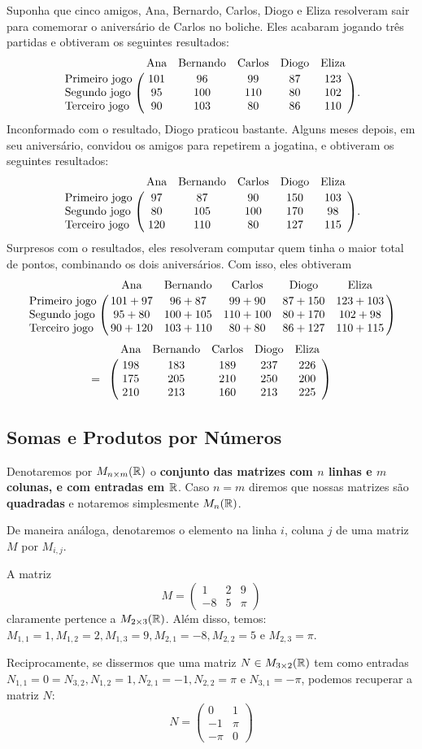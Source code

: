 \begin{ex}
	Suponha que cinco amigos, Ana, Bernardo, Carlos, Diogo e Eliza resolveram sair para comemorar o aniversário de Carlos no boliche. Eles acabaram jogando três partidas e obtiveram os seguintes resultados:
	\[\bordermatrix{
	&\text{Ana} & \text{Bernando} & \text{Carlos} & \text{Diogo} &\text{Eliza}\cr
	\text{Primeiro jogo} & 101 & 96 & 99 & 87 & 123\cr
	\text{Segundo jogo} & 95 & 100 & 110 & 80 & 102\cr
	\text{Terceiro jogo} & 90 & 103 & 80 & 86 & 110}.\]Inconformado com o resultado, Diogo praticou bastante. Alguns meses depois, em seu aniversário, convidou os amigos para repetirem a jogatina, e obtiveram os seguintes resultados:
	\[\bordermatrix{
		&\text{Ana} & \text{Bernando} & \text{Carlos} & \text{Diogo} &\text{Eliza}\cr
		\text{Primeiro jogo} & 97 & 87 & 90 & 150 & 103\cr
		\text{Segundo jogo} & 80 & 105 & 100 & 170 & 98\cr
		\text{Terceiro jogo} & 120 & 110 & 80 & 127 & 115}.\] Surpresos com o resultados, eles resolveram computar quem tinha o maior total de pontos, combinando os dois aniversários. Com isso, eles obtiveram
	\[\bordermatrix{
		&\text{Ana} & \text{Bernando} & \text{Carlos} & \text{Diogo} &\text{Eliza}\cr
		\text{Primeiro jogo} & 101+97 & 96+87 & 99+90 & 87+150 & 123+103\cr
		\text{Segundo jogo} & 95+80 & 100+105 & 110+100 & 80+170 & 102+98\cr
		\text{Terceiro jogo} & 90+120 & 103+110 & 80+80 & 86+127 & 110+115}\]\[=\bordermatrix{
		&\text{Ana} & \text{Bernando} & \text{Carlos} & \text{Diogo} &\text{Eliza}\cr
		 & 198 & 183 & 189 & 237 & 226\cr
		 & 175 & 205 & 210 & 250 & 200\cr
		 & 210 & 213 & 160 & 213 & 225}\]
\end{ex}

\subsection{Somas e Produtos por Números}

\begin{df}
	Denotaremos por $M_{n\times m}(\mathbb R)$ o \textbf{conjunto das matrizes com $n$ linhas e $m$ colunas, e com entradas em $\mathbb R$}. Caso $n=m$ diremos que nossas matrizes são \textbf{quadradas} e notaremos simplesmente $M_n(\mathbb R)$.
	
	De maneira análoga, denotaremos o elemento na linha $i$, coluna $j$ de uma matriz $M$ por $M_{i,j}$.
\end{df}

\begin{ex}
	A matriz \[M=\begin{pmatrix}
	1 & 2 & 9\\
	-8 & 5 & \pi
	\end{pmatrix}\]claramente pertence a $M_{2\times 3}(\mathbb R)$. Além disso, temos: $M_{1,1}=1,M_{1,2}=2,M_{1,3}=9,M_{2,1}=-8,M_{2,2}=5$ e $M_{2,3}=\pi$.
	
	\bigskip
	Reciprocamente, se dissermos que uma matriz $N\in M_{3\times 2}(\mathbb R)$ tem como entradas $N_{1,1}=0=N_{3,2},N_{1,2}=1,N_{2,1}=-1,N_{2,2}=\pi$ e $N_{3,1}=-\pi$, podemos recuperar a matriz $N$:
	\[N=\begin{pmatrix}
	0 & 1\\
	-1 & \pi\\
	-\pi &0
	\end{pmatrix}\]
\end{ex}

